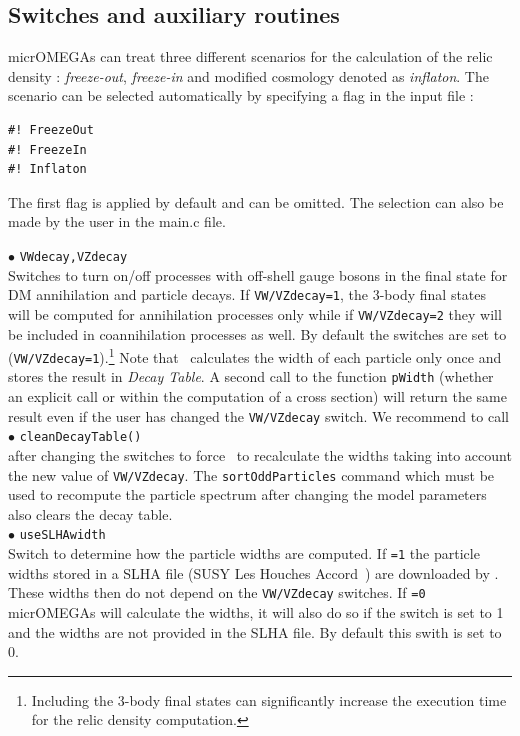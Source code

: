 \documentclass[12pt,a4paper]{article}
\begin{document}
\subsection{Switches and auxiliary routines}
\label{Switches}

 micrOMEGAs can treat three different  scenarios  for the calculation of the  relic density :
{\it freeze-out}, {\it freeze-in} and modified cosmology denoted as  {\it inflaton}. The scenario can be selected automatically by specifying a flag in the input file :
\begin{verbatim}
#! FreezeOut
#! FreezeIn 
#! Inflaton 
\end{verbatim}
The first flag is applied  by default and can be omitted. The selection can also be made by the user in the main.c file.



\noindent
$\bullet$ \verb|VWdecay,VZdecay|\\
Switches to turn on/off  processes with off-shell gauge bosons in the final state for DM annihilation and particle decays.
If \verb|VW/VZdecay=1|, the  3-body final states will be computed for annihilation processes only while 
if \verb|VW/VZdecay=2| they will be included in coannihilation processes as well.
By  default  the switches are set to (\verb|VW/VZdecay=1|).\footnote{Including the 3-body final states can significantly increase the execution time for the relic density computation.}
Note that \micro\ calculates the width of each particle only once and stores the
result in {\it Decay Table}.  A second call to the function \verb|pWidth| (whether an explicit call or within the computation of a cross section)   will return the same result  even if the user has changed the {\tt VW/VZdecay} switch.  
We recommend to call\\[2mm]
$\bullet$ \verb|cleanDecayTable()| \\
after changing the switches to force \micro\ to recalculate the widths taking into account  the new value of {\tt VW/VZdecay}.
The   {\tt sortOddParticles} command which must be used 
to recompute the particle spectrum after changing the model parameters also clears  the decay table.\\[2mm]
%
$\bullet$ \verb|useSLHAwidth|\\
Switch to  determine how the particle widths are computed. 
If {\tt =1} the particle widths  stored in  a SLHA file (SUSY Les Houches Accord~\cite{Skands:2003cj})  are downloaded by \micro. 
These widths  then do not depend on  the {\tt VW/VZdecay} switches. 
If {\tt =0} micrOMEGAs will calculate the widths, it will also do so if the switch is set to 1 and the widths  are not provided in the SLHA file. By default this swith is set to 0. 
\end{document}
